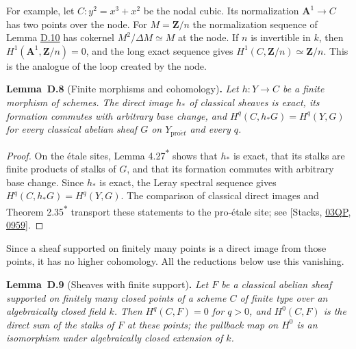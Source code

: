 \documentclass[11pt]{article}
\newenvironment{bpstatement}[2]{\par\addvspace{0.6\baselineskip}\noindent\textbf{#1}#2\textbf{.}\enspace\ignorespaces}
  {\par\addvspace{0.4\baselineskip}}
\newenvironment{bpstatementit}[2]{\begin{bpstatement}{#1}{#2}\itshape\ignorespaces}{\end{bpstatement}}
\newcommand{\bpout}[1]{#1\textsuperscript{\hyperlink{bp-outside}{\ensuremath{\ast}}}}
\begin{document}
For example, let \(C:y^2=x^3+x^2\) be the nodal cubic. Its normalization \(\mathbf A^1\to C\) has two points over the node. For \(M=\mathbf Z/n\) the normalization sequence of Lemma \hyperref[bp34]{D.10} has cokernel \(M^2/\Delta M\simeq M\) at the node. If \(n\) is invertible in \(k\), then \(H^1(\mathbf A^1,\mathbf Z/n)=0\), and the long exact sequence gives \(H^1(C,\mathbf Z/n)\simeq\mathbf Z/n\). This is the analogue of the loop created by the node.

\label{bp28}%
\begin{bpstatementit}{Lemma~D.8}{ (Finite morphisms and cohomology)}
Let \(h:Y\to C\) be a finite morphism of schemes. The direct image \(h_*\) of classical sheaves is exact, its formation commutes with arbitrary base change, and \(H^q(C,h_*G)=H^q(Y,G)\) for every classical abelian sheaf \(G\) on \(Y_{\mathrm{pro}\acute{e}t}\) and every \(q\).
\end{bpstatementit}

\begin{proof}[{Proof}]\label{bp29}%
On the étale sites, Lemma \bpout{4.27} shows that \(h_*\) is exact, that its stalks are finite products of stalks of \(G\), and that its formation commutes with arbitrary base change.  Since \(h_*\) is exact, the Leray spectral sequence gives \(H^q(C,h_*G)=H^q(Y,G)\).  The comparison of classical direct images and Theorem \bpout{2.35} transport these statements to the pro-étale site; see [Stacks, \href{https://stacks.math.columbia.edu/tag/03QP}{03QP}, \href{https://stacks.math.columbia.edu/tag/0959}{0959}].
\end{proof}

\label{bp30}%
Since a sheaf supported on finitely many points is a direct image from those points, it has no higher cohomology. All the reductions below use this vanishing.

\label{bp31}%
\begin{bpstatementit}{Lemma~D.9}{ (Sheaves with finite support)}
Let \(F\) be a classical abelian sheaf supported on finitely many closed points of a scheme \(C\) of finite type over an algebraically closed field \(k\). Then \(H^q(C,F)=0\) for \(q>0\), and \(H^0(C,F)\) is the direct sum of the stalks of \(F\) at these points; the pullback map on \(H^0\) is an isomorphism under algebraically closed extension of \(k\).
\end{bpstatementit}
\end{document}

